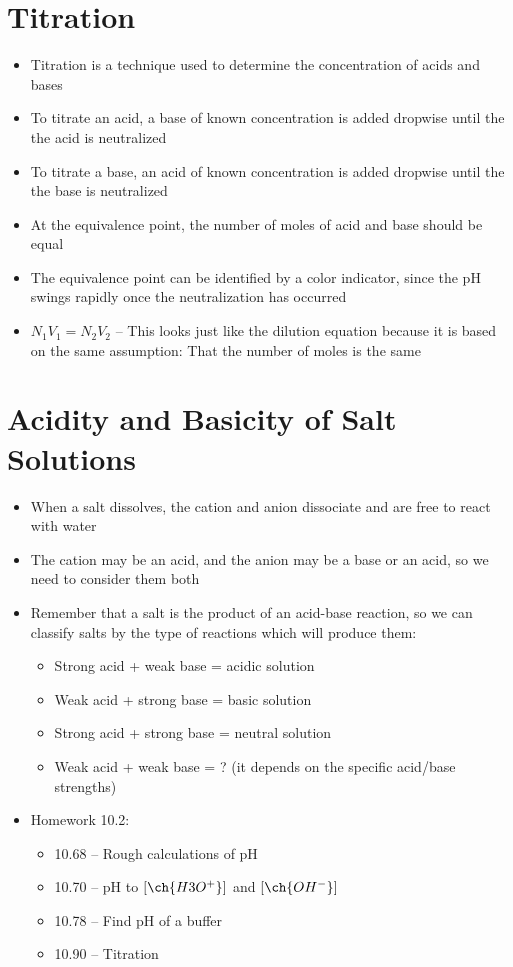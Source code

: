 \documentclass[12pt, openany, letterpaper]{memoir}
\begin{document}
\section{Titration}
\begin{itemize}
	\item Titration is a technique used to determine the concentration of acids and bases
	\item To titrate an acid, a base of known concentration is added dropwise until the the acid is neutralized
	\item To titrate a base, an acid of known concentration is added dropwise until the the base is neutralized
	\item At the equivalence point, the number of moles of acid and base should be equal
	\item The equivalence point can be identified by a color indicator, since the pH swings rapidly once the neutralization has occurred
	\item $N_1V_1=N_2V_2$ -- This looks just like the dilution equation because it is based on the same assumption: That the number of moles is the same
\end{itemize}
\section{Acidity and Basicity of Salt Solutions}
\begin{itemize}
	\item When a salt dissolves, the cation and anion dissociate and are free to react with water
	\item The cation may be an acid, and the anion may be a base or an acid, so we need to consider them both
	\item Remember that a salt is the product of an acid-base reaction, so we can classify salts by the type of reactions which will produce them:
	      \begin{itemize}
		      \item Strong acid + weak base = acidic solution
		      \item Weak acid + strong base = basic solution
		      \item Strong acid + strong base = neutral solution
		      \item Weak acid + weak base = ? (it depends on the specific acid/base strengths)
	      \end{itemize}
	\item Homework 10.2:
	      \begin{itemize}
		      \item 10.68 -- Rough calculations of pH
		      \item 10.70 -- pH to $\left[\ch{H3O^+}\right]$ and $\left[\ch{OH^-}\right]$
		      \item 10.78 -- Find pH of a buffer
		      \item 10.90 -- Titration
	      \end{itemize}
\end{itemize}
\end{document}
